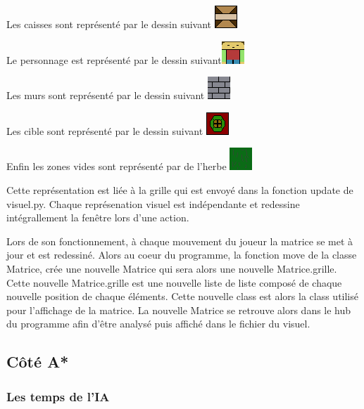 \documentclass[a4paper,12pt]{article} %
\begin{document}
Les caisses sont représenté par le dessin suivant \includegraphics{../picture/caisse.png}

Le personnage est représenté par le dessin suivant\includegraphics{../picture/heros.png}

Les murs sont représenté par le dessin suivant \includegraphics{../picture/mur.png}

Les cible sont représenté par le dessin suivant \includegraphics{../picture/ciblage_tro-oof.png}

Enfin les zones vides sont représenté par de l'herbe \includegraphics{../picture/weed.png}

Cette représentation est liée à la grille qui est envoyé dans la fonction update de visuel.py.
Chaque représenation visuel est indépendante et redessine intégrallement la fenêtre lors d'une action.

Lors de son fonctionnement, à chaque mouvement du joueur la matrice se met à jour et est redessiné.
Alors au coeur du programme, la fonction move de la classe Matrice, crée une nouvelle Matrice qui sera alors une nouvelle Matrice.grille.
Cette nouvelle Matrice.grille est une nouvelle liste de liste composé de chaque nouvelle position de chaque éléments.
Cette nouvelle class est alors la class utilisé pour l'affichage de la matrice.
La nouvelle Matrice se retrouve alors dans le hub du programme afin d'être analysé puis affiché dans le fichier du visuel.

\subsection{Côté A*}

\subsubsection{Les temps de l'IA}
\end{document}
